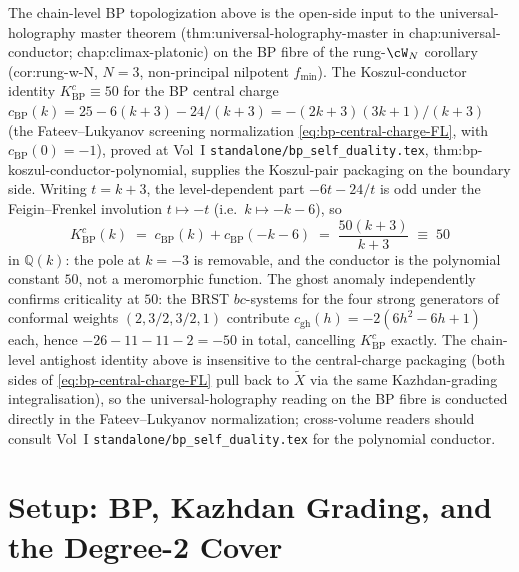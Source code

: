 \begin{remark}%
\label{rem:anchor-bp-self-duality}%
%
The chain-level BP topologization above is the open-side input to the
universal-holography master theorem
(\textsf{thm:universal-holography-master} in
\textsf{chap:universal-conductor}; \textsf{chap:climax-platonic}) on
the BP fibre of the rung-$\cW_N$ corollary
(\textsf{cor:rung-w-N}, $N=3$, non-principal nilpotent
$f_{\min}$). The Koszul-conductor identity
$K^{c}_{\mathrm{BP}} \equiv 50$ for the BP central charge
$c_{\mathrm{BP}}(k) = 25 - 6(k+3) - 24/(k+3)
= -(2k+3)(3k+1)/(k+3)$
(the Fateev--Lukyanov screening normalization
\eqref{eq:bp-central-charge-FL}, with $c_{\mathrm{BP}}(0) = -1$),
proved at Vol~I
\texttt{standalone/bp\_self\_duality.tex},
\textsf{thm:bp-koszul-conductor-polynomial}, supplies the
Koszul-pair packaging on the boundary side. Writing $t = k+3$, the
level-dependent part $-6t - 24/t$ is odd under the Feigin--Frenkel
involution $t \mapsto -t$ (i.e.\ $k \mapsto -k-6$), so
\[
 K^{c}_{\mathrm{BP}}(k)
 \;=\; c_{\mathrm{BP}}(k) + c_{\mathrm{BP}}(-k-6)
 \;=\; \frac{50(k+3)}{k+3}
 \;\equiv\; 50
\]
in $\mathbb{Q}(k)$: the pole at $k=-3$ is removable, and the
conductor is the polynomial constant $50$, not a meromorphic
function. The ghost anomaly independently confirms criticality at
$50$: the BRST $bc$-systems for the four strong generators of
conformal weights $(2, 3/2, 3/2, 1)$ contribute
$c_{\mathrm{gh}}(h) = -2(6h^2-6h+1)$ each, hence
$-26 - 11 - 11 - 2 = -50$ in total, cancelling
$K^{c}_{\mathrm{BP}}$ exactly. The chain-level antighost identity
above is insensitive to the central-charge packaging (both sides of
\eqref{eq:bp-central-charge-FL} pull back to $\widetilde X$ via the
same Kazhdan-grading integralisation), so the universal-holography
reading on the BP fibre is conducted directly in the
Fateev--Lukyanov normalization; cross-volume readers should consult
Vol~I \texttt{standalone/bp\_self\_duality.tex} for the polynomial
conductor.
\end{remark}

\section{Setup: BP, Kazhdan Grading, and the Degree-2 Cover}
\label{sec:bp-setup}


